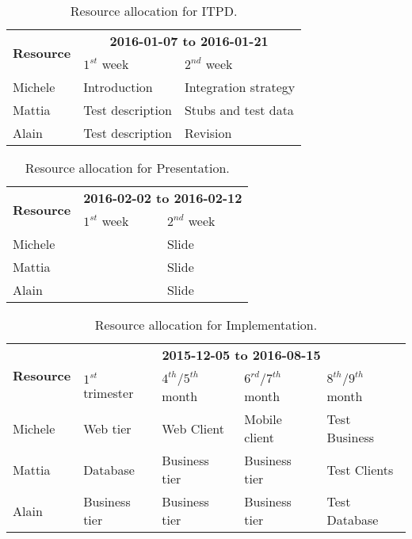 \begin{table}
    \centering
    \begin{tabular}{| l | l | l |}
        \hline
        \multirow{2}{*}{\textbf{Resource}} & \multicolumn{2}{c|}{\textbf{2016-01-07 to 2016-01-21}} \\
        \cline{2-3}
        & $1^{st}$ week & $2^{nd}$ week \\
        \hline
        Michele        & Introduction        & Integration strategy       \\
        Mattia         & Test description    & Stubs and test data    \\
        Alain          & Test description    & Revision    \\
        \hline
    \end{tabular}
    \caption{Resource allocation for ITPD.}
    \label{tab:itpd-res-alloc}
\end{table}

\begin{table}
    \centering
    \begin{tabular}{| l | l | l |}
        \hline
        \multirow{2}{*}{\textbf{Resource}} & \multicolumn{2}{c|}{\textbf{2016-02-02 to 2016-02-12}} \\
        \cline{2-3}
        & $1^{st}$ week & $2^{nd}$ week \\
        \hline
        Michele         &     & Slide    \\
        Mattia          &     & Slide    \\
        Alain           &     & Slide    \\
        \hline
    \end{tabular}
    \caption{Resource allocation for Presentation.}
    \label{tab:pres-res-alloc}
\end{table}


\begin{table}
    \centering
    \begin{tabular}{| l | l | l | l | l |}
        \hline
        \multirow{2}{*}{\textbf{Resource}} & \multicolumn{4}{c|}{\textbf{2015-12-05 to 2016-08-15}} \\
        \cline{2-5}
        & $1^{st}$ trimester & $4^{th}$/$5^{th}$ month & $6^{rd}$/$7^{th}$ month & $8^{th}$/$9^{th}$ month\\
        \hline
        Michele        & Web tier       & Web Client     & Mobile client   & Test Business    \\
        Mattia         & Database       & Business tier  & Business tier   & Test Clients   \\
        Alain          & Business tier  & Business tier  & Business tier   & Test Database  \\
        \hline
    \end{tabular}
    \caption{Resource allocation for Implementation.}
    \label{tab:impl-res-alloc}
\end{table}

